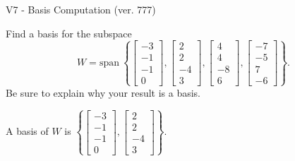 \begin{exercise}
  \begin{exerciseTitle}V7 - Basis Computation (ver. 777)\end{exerciseTitle}
  \begin{exerciseStatement}
    Find a basis for the subspace 
\[W=\mathrm{span}\ \left\{\left[\begin{array}{r}
-3 \\
-1 \\
-1 \\
0
\end{array}\right] , \left[\begin{array}{r}
2 \\
2 \\
-4 \\
3
\end{array}\right] , \left[\begin{array}{r}
4 \\
4 \\
-8 \\
6
\end{array}\right] , \left[\begin{array}{r}
-7 \\
-5 \\
7 \\
-6
\end{array}\right]\right\}.\]
 Be sure to explain why your result is a basis.


  \end{exerciseStatement}
  \begin{exerciseAnswer}
   A basis of \(W\) is  \(\left\{\left[\begin{array}{r}
-3 \\
-1 \\
-1 \\
0
\end{array}\right] , \left[\begin{array}{r}
2 \\
2 \\
-4 \\
3
\end{array}\right]\right\}\).
  


  \end{exerciseAnswer}
\end{exercise}
